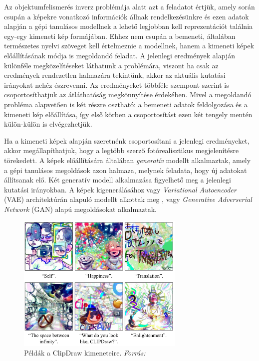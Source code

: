 Az objektumfelismerés inverz problémája alatt azt a feladatot értjük, amely során csupán a képekre vonatkozó információk állnak rendelkezésünkre és ezen adatok alapján a gépi tanulásos modellnek a lehető legjobban kell reprezentációt találnia egy-egy kimeneti kép formájában.
Ehhez nem csupán a bemeneti, általában természetes nyelvi szöveget kell értelmeznie a modellnek, hanem a kimeneti képek előállításának módja is megoldandó feladat.
A jelenlegi eredmények alapján különféle megközelítéseket láthatunk a problémára, viszont ha csak az eredmények rendezetlen halmazára tekintünk, akkor az aktuális kutatási irányokat nehéz észrevenni. Az eredményeket többféle szempont szerint is csoportosíthatjuk az átláthatóság megkönnyítése érdekében. Mivel a megoldandó probléma alapvetően is két részre osztható: a bemeneti adatok feldolgozása és a kimeneti kép előállítása, így első körben a csoportosítást ezen két tengely mentén külön-külön is elvégezhetjük.

Ha a kimeneti képek alapján szeretnénk csoportosítani a jelenlegi eredményeket, akkor megállapíthatjuk, hogy a legtöbb szerző fotórealisztikus megjelenítésre törekedett. A képek előállítására általában \textit{generatív} modellt alkalmaztak, amely a gépi tanulásos megoldások azon halmaza, melynek feladata, hogy új adatokat állítsanak elő. Két generatív modell alkalmazása figyelhető meg a jelenlegi kutatási irányokban.
A képek kigenerálásához vagy \textit{Variational Autoencoder} (VAE) architektúrán alapuló modellt alkottak meg \cite{ramesh2021zero}, vagy \textit{Generative Adverserial Network} (GAN) alapú megoldásokat \cite{dong2021unsupervised, reed2016learning, xu2018attngan, zhang2017stackgan} alkalmaztak.

\begin{figure}[h]
	\centering
	\includegraphics[width=8cm]{images/clipdraw.png}
	\caption{Példák a ClipDraw kimeneteire. \textit{Forrás: \cite{frans2021clipdraw}} }
	\label{fig:clipdraw}
\end{figure}


